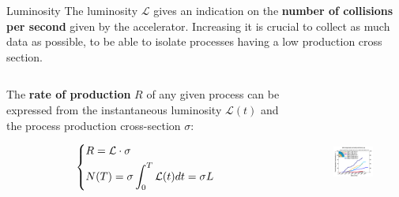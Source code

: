 \documentclass[8pt]{beamer}
\begin{document}
\begin{frame}{Luminosity}
\justifying
The \alert{luminosity $\mathcal{L}$} gives an indication on the \textbf{number of collisions per second} given by the accelerator. Increasing it is crucial to collect as much data as possible, to be able to isolate processes having a low production cross section. \vfill

\begin{columns}
	\begin{column}{0.4	\textwidth}
	\justifying	
The \textbf{rate of production} $R$ of any given process can be expressed from the instantaneous luminosity $\mathcal{L}(t)$ and the process production cross-section $\sigma$:	
	
\begin{equation*}
\begin{dcases}
R = \mathcal{L} \cdot \sigma \\
N(T) = \sigma \int_0^T \mathcal{L}(t) dt = \sigma L
\end{dcases}
\end{equation*}
\end{column}
\begin{column}{0.6	\textwidth}
\begin{figure}[htbp]
\begin{center}
\includegraphics[width=7cm, height=5cm]{figs/CumuLumi.pdf}
\end{center}
\end{figure}
\end{column}
\end{columns}

\end{frame}
\end{document}
